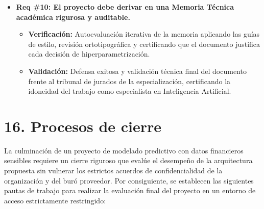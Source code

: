 \documentclass[
11pt, %
]{charter}
\begin{document}
\begin{itemize}
    \item \textbf{Req \#10: El proyecto debe derivar en una Memoria Técnica académica rigurosa y auditable.}
    \begin{itemize}
        \item \textbf{Verificación:} Autoevaluación iterativa de la memoria aplicando las guías de estilo, revisión ortotipográfica y certificando que el documento justifica cada decisión de hiperparametrización.
        \item \textbf{Validación:} Defensa exitosa y validación técnica final del documento frente al tribunal de jurados de la especialización, certificando la idoneidad del trabajo como especialista en Inteligencia Artificial.
    \end{itemize}

\end{itemize}


\section{16. Procesos de cierre}
\label{sec:cierre}

La culminación de un proyecto de modelado predictivo con datos financieros sensibles requiere un cierre riguroso que evalúe el desempeño de la arquitectura propuesta sin vulnerar los estrictos acuerdos de confidencialidad de la organización y del buró proveedor. Por consiguiente, se establecen las siguientes pautas de trabajo para realizar la evaluación final del proyecto en un entorno de acceso estrictamente restringido:
\end{document}
